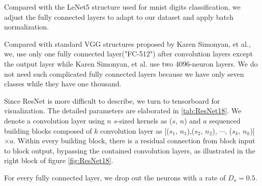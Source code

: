 \documentclass[journal, onecolumn]{IEEEtran}
\begin{document}
Compared with the LeNet5 structure used for mnist digits classification, we adjust the fully connected layers to adapt to our dataset and apply batch normalization.

Compared with standard VGG structures proposed by Karen Simonyan, et al., we, use only one fully connected layer("FC-512") after convolution layers except the output layer while Karen Simonyan, et al. use two 4096-neuron layers. We do not need such complicated fully connected layers because we have only seven classes while they have one thousand.

Since ResNet is more difficult to describe, we turn to tensorboard for visualization. The detailed parameters are elaborated in \ref{tab:ResNet18}. We denote a convolution layer using $n$ $s$-sized kernels as ($s$, $n$) and $a$ sequenced building blocks composed of $k$ convolution layer as [($s_1$, $n_1$),($s_2$, $n_2$), $\cdots$, ($s_k$, $n_k$)] $\times a$. Within every building block, there is a residual connection from block input to block output, bypassing the contained convolution layers, as illustrated in the right block of figure \ref{fig:ResNet18}.

For every fully connected layer, we drop out the neurons with a rate of $D_o=0.5$.
\end{document}
